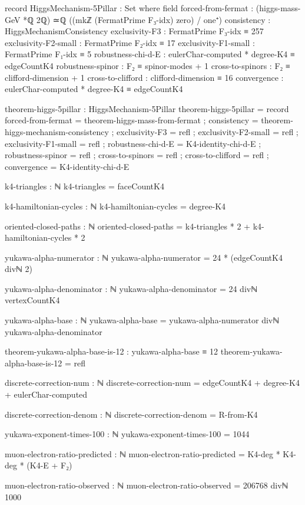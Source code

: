 \documentclass[11pt,a4paper]{book}
\begin{document}
\begin{code}
record HiggsMechanism-5Pillar : Set where
  field
    forced-from-fermat  : (higgs-mass-GeV *ℚ 2ℚ) ≃ℚ ((mkℤ (FermatPrime F₃-idx) zero) / one⁺)
    consistency         : HiggsMechanismConsistency
    exclusivity-F3      : FermatPrime F₃-idx ≡ 257
    exclusivity-F2-small : FermatPrime F₂-idx ≡ 17
    exclusivity-F1-small : FermatPrime F₁-idx ≡ 5
    robustness-chi-d-E  : eulerChar-computed * degree-K4 ≡ edgeCountK4
    robustness-spinor   : F₂ ≡ spinor-modes + 1
    cross-to-spinors    : F₂ ≡ clifford-dimension + 1
    cross-to-clifford   : clifford-dimension ≡ 16
    convergence         : eulerChar-computed * degree-K4 ≡ edgeCountK4

theorem-higgs-5pillar : HiggsMechanism-5Pillar
theorem-higgs-5pillar = record
  { forced-from-fermat  = theorem-higgs-mass-from-fermat
  ; consistency         = theorem-higgs-mechanism-consistency
  ; exclusivity-F3      = refl
  ; exclusivity-F2-small = refl
  ; exclusivity-F1-small = refl
  ; robustness-chi-d-E  = K4-identity-chi-d-E
  ; robustness-spinor   = refl
  ; cross-to-spinors    = refl
  ; cross-to-clifford   = refl
  ; convergence         = K4-identity-chi-d-E
  }

k4-triangles : ℕ
k4-triangles = faceCountK4

k4-hamiltonian-cycles : ℕ
k4-hamiltonian-cycles = degree-K4

oriented-closed-paths : ℕ
oriented-closed-paths = k4-triangles * 2 + k4-hamiltonian-cycles * 2

yukawa-alpha-numerator : ℕ
yukawa-alpha-numerator = 24 * (edgeCountK4 divℕ 2)

yukawa-alpha-denominator : ℕ
yukawa-alpha-denominator = 24 divℕ vertexCountK4

yukawa-alpha-base : ℕ
yukawa-alpha-base = yukawa-alpha-numerator divℕ yukawa-alpha-denominator

theorem-yukawa-alpha-base-is-12 : yukawa-alpha-base ≡ 12
theorem-yukawa-alpha-base-is-12 = refl

discrete-correction-num : ℕ
discrete-correction-num = edgeCountK4 + degree-K4 + eulerChar-computed

discrete-correction-denom : ℕ
discrete-correction-denom = R-from-K4

yukawa-exponent-times-100 : ℕ
yukawa-exponent-times-100 = 1044

muon-electron-ratio-predicted : ℕ
muon-electron-ratio-predicted = K4-deg * K4-deg * (K4-E + F₂)


muon-electron-ratio-observed : ℕ
muon-electron-ratio-observed = 206768 divℕ 1000




\end{code}
\end{document}
